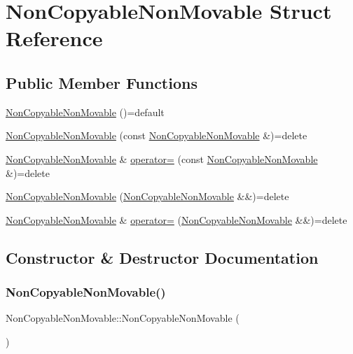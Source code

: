 \hypertarget{structNonCopyableNonMovable}{}\section{Non\+Copyable\+Non\+Movable Struct Reference}
\label{structNonCopyableNonMovable}
\subsection*{Public Member Functions}
\begin{DoxyCompactItemize}
\item 
\hyperlink{structNonCopyableNonMovable_ac6158be93fae560d3eb76866e999b43c}{Non\+Copyable\+Non\+Movable} ()=default
\item 
\hyperlink{structNonCopyableNonMovable_ae703e4b57bc2b31c5a1a595ce1522393}{Non\+Copyable\+Non\+Movable} (const \hyperlink{structNonCopyableNonMovable}{Non\+Copyable\+Non\+Movable} \&)=delete
\item 
\hyperlink{structNonCopyableNonMovable}{Non\+Copyable\+Non\+Movable} \& \hyperlink{structNonCopyableNonMovable_af20f4599a87549a42f725047a934b5a8}{operator=} (const \hyperlink{structNonCopyableNonMovable}{Non\+Copyable\+Non\+Movable} \&)=delete
\item 
\hyperlink{structNonCopyableNonMovable_a59843becd2600f24c94c50479f01ffcf}{Non\+Copyable\+Non\+Movable} (\hyperlink{structNonCopyableNonMovable}{Non\+Copyable\+Non\+Movable} \&\&)=delete
\item 
\hyperlink{structNonCopyableNonMovable}{Non\+Copyable\+Non\+Movable} \& \hyperlink{structNonCopyableNonMovable_a2e1af14022b8a268721bed0e3f7391c4}{operator=} (\hyperlink{structNonCopyableNonMovable}{Non\+Copyable\+Non\+Movable} \&\&)=delete
\end{DoxyCompactItemize}


\subsection{Constructor \& Destructor Documentation}
\mbox{\label{structNonCopyableNonMovable_ac6158be93fae560d3eb76866e999b43c}} 
\subsubsection{\texorpdfstring{Non\+Copyable\+Non\+Movable()}{NonCopyableNonMovable()}\hspace{0.1cm}{\footnotesize\ttfamily [1/3]}}
{\footnotesize\ttfamily Non\+Copyable\+Non\+Movable\+::\+Non\+Copyable\+Non\+Movable (\begin{DoxyParamCaption}{ }\end{DoxyParamCaption})\hspace{0.3cm}{\ttfamily [default]}}

